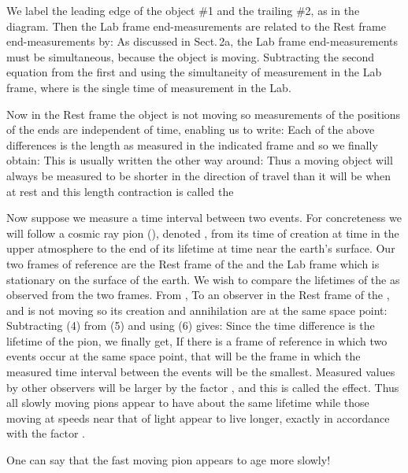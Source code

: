 {
We label the leading edge of the object \#1 and the trailing \#2, as in
the diagram.
Then the Lab frame end-measurements are related to the Rest frame
end-measurements by:
%
%
%
As discussed in Sect.\,2a, the Lab frame end-measurements must be
simultaneous,
%
%
because the object is moving.
Subtracting the second equation from the first and using the simultaneity of
measurement in the Lab frame,
%
%
where  is the single time of measurement in the Lab.

Now in the Rest frame the object is not moving so measurements of the
positions of the ends are independent of time, enabling us to write:
%
%
Each of the above differences is the length as measured in the indicated
frame and so we finally obtain:
%
%
This is usually written the other way around:
%
%
Thus a moving object will always be measured to be shorter in the direction
of travel than it will be when at rest and this length contraction is called
the 

Now suppose we measure a time interval between two events.
For concreteness we will follow a cosmic ray pion (),
denoted \m{\pi}, from its time of creation at time  in the upper
atmosphere to the end of its lifetime at time  near the earth's
surface.
Our two frames of reference are the Rest frame of the \m{\pi} and the Lab frame
which is stationary on the surface of the earth.
We wish to compare the lifetimes of the \m{\pi} as observed from the two
frames.
%
From ,
%
%
%
To an observer in the Rest frame of the \m{\pi}, and \m{\pi} is not moving so its
creation and annihilation are at the same space point:
%
%
Subtracting (4) from (5) and using (6) gives:
%
%
Since the time difference  is the lifetime \m{\tau} of the pion, we
finally get,
%
%
If there is a frame of reference  in which two events occur at the same
space point, that will be the frame in which the measured time interval
between the events will be the smallest.
Measured values by other observers will be larger by the factor , and
this is called the  effect.
Thus all slowly moving pions appear to have about the same lifetime while
those moving at speeds near that of light appear to live longer, exactly
in accordance with the factor .

One can say that the fast moving pion appears to age more slowly!
}%
